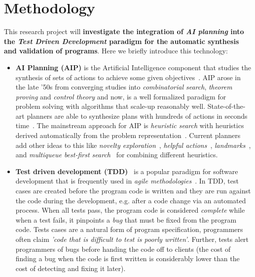 \documentclass[10pt,a4paper]{paper}
\begin{document}
\section{Methodology}
\label{sec:methodology}
This research project will {\bf investigate the integration of {\em AI planning} into the {\em Test Driven Development} paradigm for the automatic synthesis and validation of programs}. Here we briefly introduce this technology:
\begin{itemize}
\item {\bf AI Planning (AIP)} is the Artificial Intelligence component that studies the synthesis of sets of actions to achieve some given objectives~\cite{ghallab2004automated}. AIP arose in the late ’50s from converging studies into {\em combinatorial search}, {\em theorem proving} and {\em control theory} and now, is a well formalized paradigm for problem solving with algorithms that scale-up reasonably well. State-of-the-art planners are able to synthesize plans with hundreds of actions in seconds time~\cite{geffner2013concise}.  The mainstream approach for AIP is {\em heuristic search} with heuristics derived automatically from the problem representation~\cite{mcdermott1996heuristic,bonet2001planning}.  Current planners add other ideas to this like {\it novelty exploration}~\cite{geffner:psimulators:IJCAI17}, {\it helpful actions}~\cite{hoffmann2001ff}, {\it landmarks}~\cite{helmert2006fast}, and {\it multiqueue best-first search}~\cite{richter2010lama} for combining different heuristics.
  
\item {\bf Test driven development (TDD)}~\cite{beck:TDD:2003} is a popular paradigm for software development that is frequently used in {\it agile methodologies}~\cite{cohen2003agile}. In TDD, test cases are created before the program code is written and they are run against the code during the development, e.g. after a code change via an automated process. When all tests pass, the program code is considered {\em complete} while when a test fails, it pinpoints a {\em bug} that must be fixed from the program code. Tests cases are a natural form of program specification, programmers often claim {\em 'code that is difficult to test is poorly written'}. Further, tests alert programmers of bugs before handing the code off to clients (the cost of finding a bug when the code is first written is considerably lower than the cost of detecting and fixing it later). %
\end{itemize}
\end{document}
